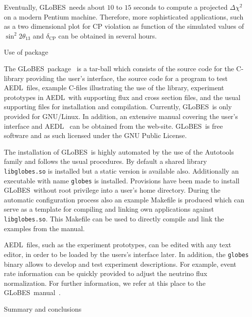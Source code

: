 \documentclass[12pt,a4paper]{article}
\makeatletter
\renewcommand{\section}{\@startsection{section}{1}{0em}{-\baselineskip}%
{\baselineskip}{\normalfont\large\bfseries}}
\newcommand{\deltacp}{\delta_{\mathrm{CP}}}
\newcommand{\stheta}{\sin^2 2 \theta_{13}}
\newcommand{\GLOBES}{{\sf GLoBES}}
\newcommand{\AEDL}{{\sf AEDL}}
\makeatother
\begin{document}
Eventually, \GLOBES\ needs about $10$ to $15$ seconds to compute
a projected $\Delta \chi^2$ on a modern Pentium machine. Therefore,
more sophisticated applications, such as a two dimensional plot
for CP violation as function of the simulated values of $\stheta$ and
$\deltacp$ can be obtained in several hours.

\section{Use of package}

The \GLOBES\ package~\cite{Globes} is a tar-ball which consists of the
source code for the C-library providing the user's interface, the source code
 for a program to test
\AEDL\ files, example C-files illustrating the use of the library, 
experiment prototypes in \AEDL\ with supporting flux and cross 
section files, and the usual 
supporting files for installation and compilation.
Currently, \GLOBES\ is only provided for GNU/Linux.
In addition, an extensive manual covering the user's interface and 
\AEDL~\cite{Manual} 
can be obtained from the web-site. \GLOBES\ is free software and as such 
licensed under the GNU Public License.

The installation of \GLOBES\ is highly automated by the use of the
Autotools family and follows the usual procedures. By default
a shared library {\tt libglobes.so} is installed but 
a static version is available
also. Additionally an executable with name {\tt globes} is installed. 
Provisions have been made to install \GLOBES\ without
root privilege into a user's home directory. During the automatic
configuration process also an example Makefile is produced which can
serve as a template for compiling and linking own applications against
{\tt libglobes.so}. This Makefile can be used to directly compile and
link the examples
from the manual. 

\AEDL\ files, such as the experiment prototypes,
can be edited with any text editor, in order to be loaded by the
users's interface later. In addition, the {\tt globes} binary allows to
develop and test experiment descriptions. For example, event rate
information can be quickly provided to adjust the neutrino flux
normalization. For further information, we refer
at this place to the \GLOBES\ manual~\cite{Manual}.

\section{Summary and conclusions}
\end{document}

